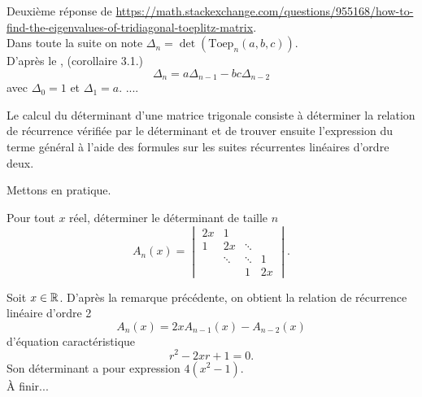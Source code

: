 \begin{preuve}
    Deuxième réponse de \url{https://math.stackexchange.com/questions/955168/how-to-find-the-eigenvalues-of-tridiagonal-toeplitz-matrix}. \\
    Dans toute la suite on note $\Delta_n = \det(\mathrm{Toep}_n(a,b,c))$. \\
    D'après le , (corollaire 3.1.)
    $$\Delta_n = a \Delta_{n-1} - bc \Delta_{n-2}$$
    avec $\Delta_0 = 1$ et $\Delta_1 = a$.
    ....
\end{preuve}

\begin{methode}
    Le calcul du déterminant d'une matrice trigonale consiste à déterminer la relation de récurrence vérifiée par le déterminant et de trouver ensuite l'expression du terme général à l'aide des formules sur les suites récurrentes linéaires d'ordre deux. 
\end{methode}

Mettons en pratique.

\begin{exercice}
Pour tout $x$ réel, déterminer le déterminant de taille $n$
    $$
        A_n(x)=\begin{vmatrix}
            2x & 1 & & \\
            1 & 2x & \ddots\\
            & \ddots & \ddots & 1\\
            & & 1 & 2x
        \end{vmatrix}.
    $$   
\end{exercice}

\begin{solution}
    Soit $x \in \mathbb{R}$. D'après la remarque précédente, on obtient la relation de récurrence linéaire d'ordre 2
    $$A_n(x) = 2x A_{n-1}(x) - A_{n-2}(x)$$
    d'équation caractéristique 
    $$r^2 - 2xr + 1 = 0.$$
    Son déterminant a pour expression $4(x^2-1)$. \\
    À finir...
\end{solution}
 
